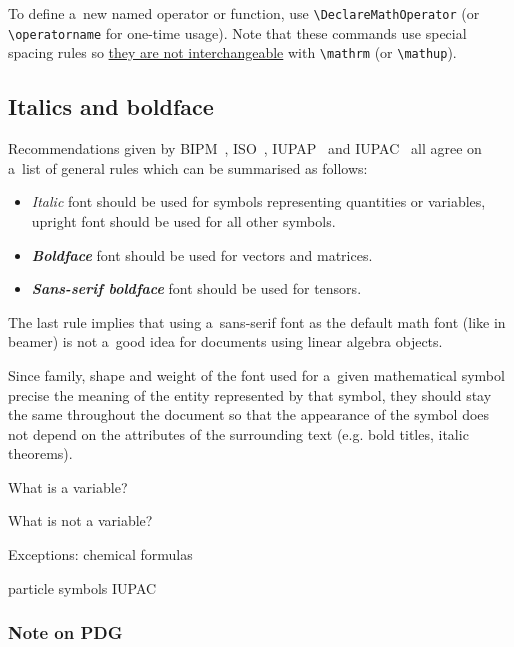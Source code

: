 \documentclass[12pt,a4paper]{article}
\begin{document}
To define a~new named operator or function, use \verb_\DeclareMathOperator_ (or \verb_\operatorname_ for one-time usage).
Note that these commands use special spacing rules so \href{https://tex.stackexchange.com/a/48463}{they are not interchangeable} with \verb_\mathrm_ (or \verb_\mathup_).

\subsection{Italics and boldface}

Recommendations given by BIPM~\cite{bipm-si-brochure}, ISO~\cite{iso-80000-1,iso-80000-2}, IUPAP~\cite{iupap-red-book} and IUPAC~\cite{iupac-green-book} all agree on a~list of general rules which can be summarised as follows:

\begin{itemize}
\item \textit{Italic} font should be used for symbols representing quantities or variables, upright font should be used for all other symbols.
\item \textbf{\textit{Boldface}} font should be used for vectors and matrices.
\item \textsf{\textbf{\textit{Sans-serif boldface}}} font should be used for tensors.
\end{itemize}

The last rule implies that using a~sans-serif font as the default math font (like in beamer) is not a~good idea for documents using linear algebra objects.

Since family, shape and weight of the font used for a~given mathematical symbol precise the meaning of the entity represented by that symbol, they should stay the same throughout the document so that the appearance of the symbol does not depend on the attributes of the surrounding text (e.g. bold titles, italic theorems).

What is a variable?

What is not a variable?

Exceptions: chemical formulas


particle symbols
IUPAC~\cite[Secs. 1.6, 2.10.1 (ii)]{iupac-green-book}

\subsubsection{Note on PDG}
\end{document}
